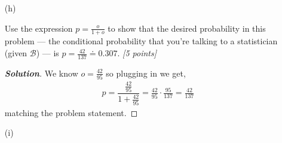 \documentclass[12pt]{article}
\newcommand{\given}{\, | \,}
\newenvironment{solution}{\begin{proof}[\textbf{\textit{Solution}}] }{\end{proof}}
\begin{document}
\begin{itemize}
\begin{solution}
    These two together will let us solve for (1),
    \begin{align*}
        \dfrac{P(St \given Sh, \mathcal{B})}{P(E \given Sh, \mathcal{B})} = \dfrac{1}{19} \cdot \dfrac{42}{5} = \dfrac{42}{95} = o
    \end{align*}
    which means we have a 95 to 42 posterior odds against $St$ given the data and the background statement, which matches the problem statement. 
\end{solution}

\vspace*{1.0in}

\item[(h)]

Use the expression $p = \frac{ o }{ 1 + o }$ to show that the desired probability in this problem --- the conditional probability that you're talking to a statistician (given $\mathcal{ B }$) --- is $p = \frac{ 42 }{ 137 } \doteq 0.307$. \textit{[5 points]}

\begin{solution}
    We know $o = \frac{42}{95}$ so plugging in we get,
    \begin{align*}
        p = \dfrac{\frac{42}{95}}{1 + \frac{42}{95}} = \frac{42}{95} \cdot\frac{95}{137} = \frac{42}{137}
    \end{align*}
    matching the problem statement. 
\end{solution}

\vspace*{0.75in}

\item[(i)]


\end{itemize}
\end{document}
